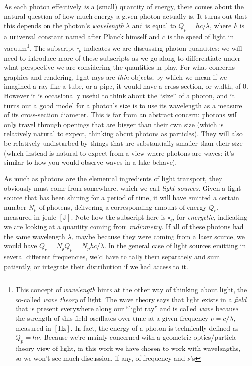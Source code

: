 As each photon effectively \emph{is} a (small) quantity of energy, there comes about the natural
question of how much energy a given photon actually is. 
It turns out that this depends on the photon's \textsl{\gls{wavelength}} $\lambda$ and is equal 
to $Q_p = hc/\lambda$, where $h$ is a universal constant named after Planck himself
and $c$ is the speed of light in vacuum\footnote{This concept of \textsl{wavelength} hints 
	at the other way of thinking about light, the so-called \textsl{wave theory} of light. 
	The wave theory says that light exists in a \textsl{field} that is 
	present everywhere along our ``light ray'' and is called \textsl{wave} because the strength 
	of this field oscillates over time at a given frequency $\nu = c/\lambda$, 
	measured in $[\unit\hertz]$. 
	In fact, the energy of a photon is technically defined as $Q_p = h\nu$. 
	Because we're mainly concerned with a geometric-optics/particle-theory view of light, 
	in this work we have chosen to work with wavelengths, so we won't
	see much discussion, if any, of frequency and $\nu$'s}. 
The subscript $\square_p$ indicates we are discussing photon quantities: 
we will need to introduce more of these subscripts as we go along to differentiate under 
what perspective we are considering the quantities in play.
For what concerns graphics and rendering, light rays are \textsl{thin} objects, by which we mean 
if we imagined a ray like a tube, or a pipe, it would have a cross section, or width, of $0$. 
However it is occasionally useful to think about the ``size'' of a photon, and it turns out a 
good model for a photon's size is to use its wavelength as a measure of its cross-section diameter.
This is far from an abstract concern: photons will only travel through openings that are bigger 
than their own size (which is relatively natural to expect, thinking about photons as particles).
They will also be relatively undisturbed by things that are substantially smaller than their
size (which instead is natural to expect from a view where photons are waves: it's similar to
how you would observe waves in a lake behave).

As much as photons are the elemental ingredients of light transport, 
they obviously must come from somewhere, which we call \textsl{light sources}.
Given a light source that has been shining for a period of time, it will have emitted a
certain number $N_p$ of photons, delivering a corresponding amount of energy $Q_e$, measured in
joule $[\unit{\joule}]$. Note how the subscript here is $\square_e$, for \textsl{energetic}, indicating
we are looking at a quantity coming from \textsl{\gls{radiometry}}. 
If all of these photons had the same wavelength $\lambda$, maybe because they were coming 
from a laser source, we would have $Q_e = N_p Q_p = N_p  hc/\lambda$. In the general case
of light sources emitting in several different frequencies, we'd have to tally them separately
and sum patiently, or integrate their distribution if we had access to it.

